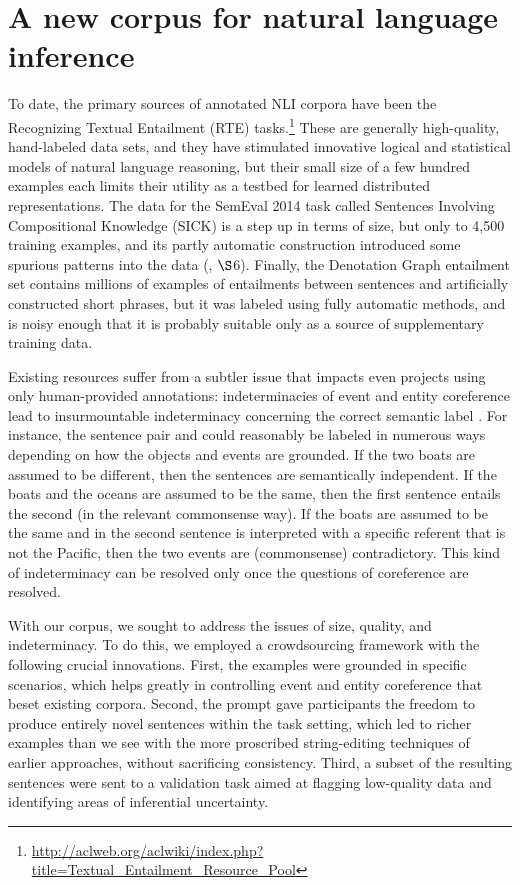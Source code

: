 \section{A new corpus for natural language inference}\label{sec:discussion}

To date, the primary sources of annotated NLI corpora have been the
Recognizing Textual Entailment (RTE)
tasks.\footnote{\url{http://aclweb.org/aclwiki/index.php?title=Textual_Entailment_Resource_Pool}}
These are generally high-quality, hand-labeled data sets, and they
have stimulated innovative logical and statistical models of natural
language reasoning, but their small size of a few hundred examples each
limits their utility as a testbed for learned distributed representations. 
The data for the SemEval 2014 task called Sentences Involving Compositional Knowledge (SICK) is a
step up in terms of size, but only to 4,500 training examples, and its
partly automatic construction introduced some spurious patterns into
the data (\citealt{marelli2014semeval}, $\S$6). Finally, the
Denotation Graph entailment set \cite{hodoshimage} contains millions of
examples of entailments between sentences and artificially constructed
short phrases, but it was labeled using fully automatic methods, and is
noisy enough that it is probably suitable only as a source of
supplementary training data.

Existing resources suffer from a subtler issue that impacts even
projects using only human-provided annotations: indeterminacies of
event and entity coreference lead to insurmountable indeterminacy
concerning the correct semantic label \cite{marelli2014sick}. For
instance, the sentence pair  and  could reasonably be labeled in
numerous ways depending on how the objects and events are grounded. If
the two boats are assumed to be different, then the sentences are semantically
independent. If the boats and the oceans are assumed to be the same,
then the first sentence entails the second (in the relevant
commonsense way). If the boats are assumed to be the same and 
 in the second sentence is interpreted with a specific referent 
that is not the Pacific, then the two events are (commonsense) contradictory. This
kind of indeterminacy can be resolved only once the questions of
coreference are resolved.

With our corpus, we sought to address the issues of size, quality, and
indeterminacy. To do this, we employed a crowdsourcing framework with
the following crucial innovations. First, the examples were grounded
in specific scenarios, which helps greatly in controlling event and
entity coreference that beset existing corpora. Second, the prompt
gave participants the freedom to produce entirely novel sentences
within the task setting, which led to richer examples than we see with
the more proscribed string-editing techniques of earlier approaches,
without sacrificing consistency. Third, a subset of the resulting
sentences were sent to a validation task aimed at flagging low-quality
data and identifying areas of inferential uncertainty.

